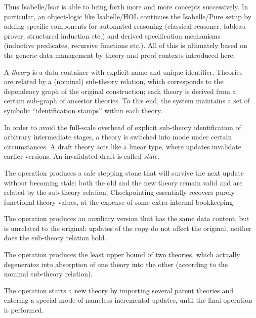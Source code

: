 \begin{isabellebody}
\begin{isamarkuptext}
  \medskip Thus Isabelle/Isar is able to bring forth more and more
  concepts successively.  In particular, an object-logic like
  Isabelle/HOL continues the Isabelle/Pure setup by adding specific
  components for automated reasoning (classical reasoner, tableau
  prover, structured induction etc.) and derived specification
  mechanisms (inductive predicates, recursive functions etc.).  All of
  this is ultimately based on the generic data management by theory
  and proof contexts introduced here.%
\end{isamarkuptext}%
\isamarkuptrue%
%
\isamarkuptrue%
%
\begin{isamarkuptext}%
A \emph{theory} is a data container with explicit name and
  unique identifier.  Theories are related by a (nominal) sub-theory
  relation, which corresponds to the dependency graph of the original
  construction; each theory is derived from a certain sub-graph of
  ancestor theories.  To this end, the system maintains a set of
  symbolic ``identification stamps'' within each theory.

  In order to avoid the full-scale overhead of explicit sub-theory
  identification of arbitrary intermediate stages, a theory is
  switched into  mode under certain circumstances.  A
  draft theory acts like a linear type, where updates invalidate
  earlier versions.  An invalidated draft is called \emph{stale}.

  The  operation produces a safe stepping stone
  that will survive the next update without becoming stale: both the
  old and the new theory remain valid and are related by the
  sub-theory relation.  Checkpointing essentially recovers purely
  functional theory values, at the expense of some extra internal
  bookkeeping.

  The  operation produces an auxiliary version that has
  the same data content, but is unrelated to the original: updates of
  the copy do not affect the original, neither does the sub-theory
  relation hold.

  The  operation produces the least upper bound of two
  theories, which actually degenerates into absorption of one theory
  into the other (according to the nominal sub-theory relation).

  The  operation starts a new theory by importing
  several parent theories and entering a special mode of nameless
  incremental updates, until the final  operation is
  performed.


\end{isamarkuptext}
\end{isabellebody}
